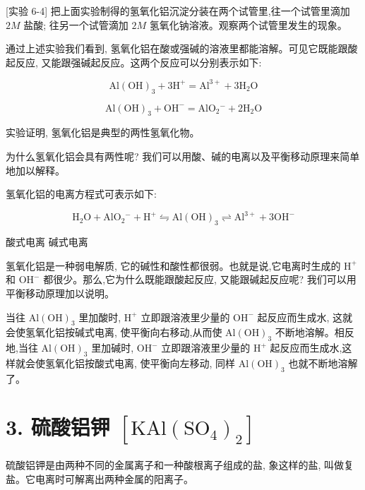 \documentclass[10pt]{article}
\begin{document}
[实验 6-4] 把上面实验制得的氢氧化铝沉淀分装在两个试管里,往一个试管里滴加 \({2M}\) 盐酸; 往另一个试管滴加 \({2M}\) 氢氧化钠溶液。观察两个试管里发生的现象。

通过上述实验我们看到, 氢氧化铝在酸或强碱的溶液里都能溶解。可见它既能跟酸起反应, 又能跟强碱起反应。这两个反应可以分别表示如下:

\[
\mathrm{{Al}}{\left( \mathrm{{OH}}\right) }_{3} + 3{\mathrm{H}}^{ + } = {\mathrm{{Al}}}^{3 + } + 3{\mathrm{H}}_{2}\mathrm{O}
\]

\[
\mathrm{{Al}}{\left( \mathrm{{OH}}\right) }_{3} + {\mathrm{{OH}}}^{ - } = {\mathrm{{AlO}}}_{2}{}^{ - } + 2{\mathrm{H}}_{2}\mathrm{O}
\]

实验证明, 氢氧化铝是典型的两性氢氧化物。

为什么氢氧化铝会具有两性呢? 我们可以用酸、碱的电离以及平衡移动原理来简单地加以解释。

氢氧化铝的电离方程式可表示如下:

\[
{\mathrm{H}}_{2}\mathrm{O} + {\mathrm{{AlO}}}_{2}{}^{ - } + {\mathrm{H}}^{ + } \leftrightharpoons \mathrm{{Al}}{\left( \mathrm{{OH}}\right) }_{3} \rightleftharpoons {\mathrm{{Al}}}^{3 + } + 3{\mathrm{{OH}}}^{ - }
\]

酸式电离 碱式电离

氢氧化铝是一种弱电解质, 它的碱性和酸性都很弱。也就是说,它电离时生成的 \({\mathrm{H}}^{ + }\) 和 \({\mathrm{{OH}}}^{ - }\) 都很少。那么,它为什么既能跟酸起反应, 又能跟碱起反应呢? 我们可以用平衡移动原理加以说明。

当往 \(\mathrm{{Al}}{\left( \mathrm{{OH}}\right) }_{3}\) 里加酸时, \({\mathrm{H}}^{ + }\) 立即跟溶液里少量的 \({\mathrm{{OH}}}^{ - }\) 起反应而生成水, 这就会使氢氧化铝按碱式电离, 使平衡向右移动,从而使 \(\mathrm{{Al}}{\left( \mathrm{{OH}}\right) }_{3}\) 不断地溶解。相反地,当往 \(\mathrm{{Al}}{\left( \mathrm{{OH}}\right) }_{3}\) 里加碱时, \({\mathrm{{OH}}}^{ - }\) 立即跟溶液里少量的 \({\mathrm{H}}^{ + }\) 起反应而生成水,这样就会使氢氧化铝按酸式电离, 使平衡向左移动, 同样 \(\mathrm{{Al}}{\left( \mathrm{{OH}}\right) }_{3}\) 也就不断地溶解了。

\section*{3. 硫酸铝钾 \(\left\lbrack {\mathrm{{KAl}}{\left( {\mathrm{{SO}}}_{4}\right) }_{2}}\right\rbrack\)}

硫酸铝钾是由两种不同的金属离子和一种酸根离子组成的盐, 象这样的盐, 叫做复盐。它电离时可解离出两种金属的阳离子。
\end{document}
